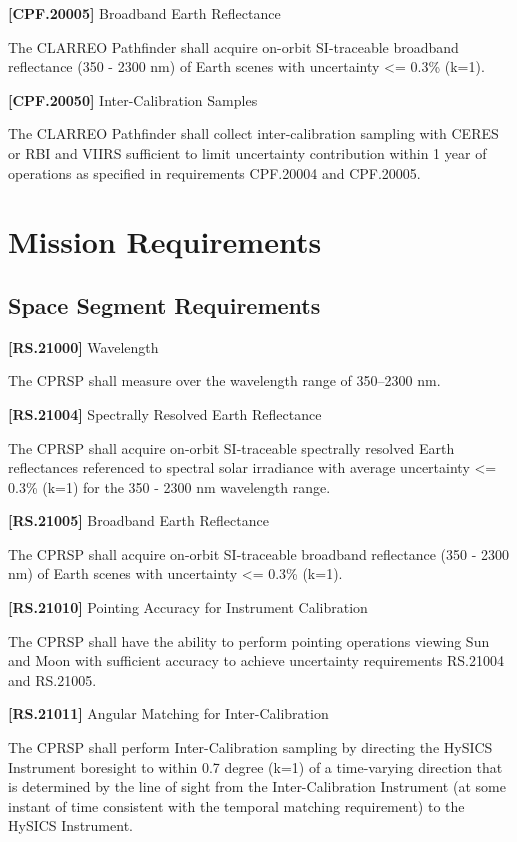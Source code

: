 \documentclass[12pt,oneside,oldfontcommands]{memoir}
\begin{document}
\textbf{[CPF.20005]} Broadband Earth Reflectance

The \gls{CLARREO} Pathfinder shall acquire on-orbit \gls{SI}-traceable broadband reflectance (350 - 2300 nm) of Earth scenes with uncertainty <= 0.3\% (k=1).

\textbf{[CPF.20050]} Inter-Calibration Samples

The \gls{CLARREO} Pathfinder shall \gls{collect} inter-calibration sampling with \gls{CERES} or \gls{RBI} and \gls{VIIRS} sufficient to limit uncertainty contribution within 1 year of operations as specified in requirements \gls{CPF}.20004 and \gls{CPF}.20005.

\section{Mission Requirements}
\label{missionrequirements}

\subsection{Space Segment Requirements}
\label{spacesegmentrequirements}

\textbf{[RS.21000]} Wavelength

The \gls{CPRSP} shall \gls{measure} over the wavelength range of 350--2300 nm.

\textbf{[RS.21004]} Spectrally Resolved Earth Reflectance

The \gls{CPRSP} shall acquire on-orbit \gls{SI}-traceable spectrally resolved Earth reflectances referenced to spectral solar irradiance with average uncertainty <= 0.3\% (k=1) for the 350 - 2300 nm wavelength range.

\textbf{[RS.21005]} Broadband Earth Reflectance

The \gls{CPRSP} shall acquire on-orbit \gls{SI}-traceable broadband reflectance (350 - 2300 nm) of Earth scenes with uncertainty <= 0.3\% (k=1).

\textbf{[RS.21010]} Pointing Accuracy for Instrument Calibration

The \gls{CPRSP} shall have the ability to perform \gls{point}ing operations viewing Sun and Moon with sufficient accuracy to achieve uncertainty requirements \gls{RS}.21004 and \gls{RS}.21005.

\textbf{[RS.21011]} Angular Matching for Inter-Calibration

The \gls{CPRSP} shall perform Inter-Calibration sampling by directing the \gls{HySICS} Instrument boresight to within 0.7 degree (k=1) of a time-varying direction that is determined by the line of sight from the Inter-Calibration Instrument (at some instant of time consistent with the temporal matching requirement) to the \gls{HySICS} Instrument.
\end{document}
